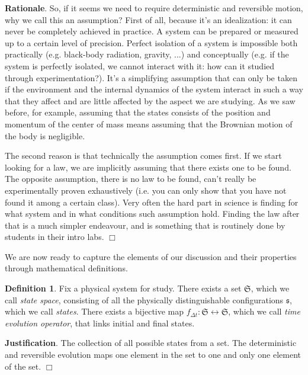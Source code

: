 \documentclass[aps,pra,10pt,twocolumn,floatfix,nofootinbib]{revtex4-1}
\theoremstyle{definition}
\newtheorem{defn}[thm]{Definition}
\newenvironment{rationale}{\textbf{Rationale}.}{$\Box$}
\newenvironment{justification}{\textbf{Justification}.}{$\Box$}
\begin{document}
\begin{rationale}
So, if it seems we need to require deterministic and reversible motion, why we call this an assumption? First of all, because it's an idealization: it can never be completely achieved in practice. A system can be prepared or measured up to a certain level of precision. Perfect isolation of a system is impossible both practically (e.g. black-body radiation, gravity, ...) and conceptually (e.g. if the system is perfectly isolated, we cannot interact with it: how can it studied through experimentation?). It's a simplifying assumption that can only be taken if the environment and the internal dynamics of the system interact in such a way that they affect and are little affected by the aspect we are studying. As we saw before, for example, assuming that the states consists of the position and momentum of the center of mass means assuming that the Brownian motion of the body is negligible.

The second reason is that technically the assumption comes first. If we start looking for a law, we are implicitly assuming that there exists one to be found. The opposite assumption, there is no law to be found, can't really be experimentally proven exhaustively (i.e. you can only show that you have not found it among a certain class). Very often the hard part in science is finding for what system and in what conditions such assumption hold. Finding the law after that is a much simpler endeavour, and is something that is routinely done by students in their intro labs.
\end{rationale}

We are now ready to capture the elements of our discussion and their properties through mathematical definitions.

\begin{defn}\label{statedef}
Fix a physical system for study. There exists a set $\mathfrak{S}$, which we call \emph{state space}, consisting of all the physically distinguishable configurations $\mathfrak{s}$, which we call \emph{states}. There exists a bijective map $f_{\Delta t}:\mathfrak{S} \leftrightarrow \mathfrak{S}$, which we call \emph{time evolution operator}, that links initial and final states.
\end{defn}

\begin{justification}
The collection of all possible states from a set. The deterministic and reversible evolution maps one element in the set to one and only one element of the set.
\end{justification}
\end{document}
